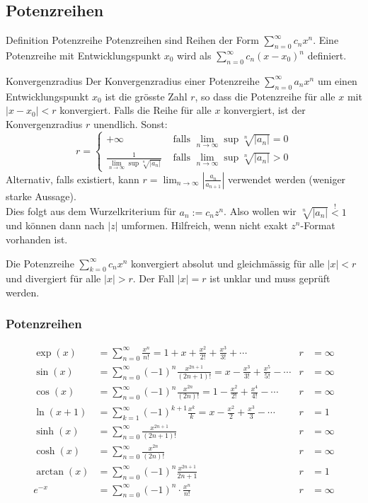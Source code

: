 \documentclass[a4paper,10pt]{article}
\def\limn{\lim_{n\to \infty}}
\def\sumk{\sum_{k=1}^\infty}
\def\sumn{\sum_{n=0}^\infty}
\begin{document}
\subsection{Potenzreihen}
\begin{subbox}{Definition Potenzreihe}
 Potenzreihen sind Reihen der Form $\sum_{n=0}^\infty c_n x^n$. Eine Potenzreihe mit Entwicklungspunkt $x_0$ wird als $\sum_{n=0}^\infty c_n(x-x_0)^n$ definiert.
\end{subbox}

\begin{mainbox}{Konvergenzradius}
 Der Konvergenzradius einer Potenzreihe $\sumn a_n x^n$ um einen Entwicklungspunkt $x_0$ ist die grösste Zahl $r$, so dass die Potenzreihe für alle $x$ mit $|x - x_0| < r$ konvergiert. Falls die Reihe für alle $x$ konvergiert, ist der Konvergenzradius $r$ unendlich. Sonst:
 $$r = \begin{cases}
    +\infty & \text{ falls } \limn\sup \sqrt[n]{|a_n|} = 0\\
    \frac{1}{\limn\sup \sqrt[n]{|a_n|}} & \text{ falls }  \limn\sup \sqrt[n]{|a_n|} > 0
 \end{cases} $$
 Alternativ, falls existiert, kann $r = \limn \left| \frac{a_n}{a_{n+1}} \right|$ verwendet werden (weniger starke Aussage).\\
 Dies folgt aus dem Wurzelkriterium für $a_n := c_n z^n$. Also wollen wir $\sqrt[n]{|a_n|} \overset{!}{<} 1$ und können dann nach $|z|$ umformen. Hilfreich, wenn nicht exakt $z^n$-Format vorhanden ist.
\end{mainbox}
Die Potenzreihe $\sum_{k=0}^\infty c_n x^n$ konvergiert absolut und gleichmässig für alle $|x| < r$ und divergiert für alle $|x| > r$. Der Fall $|x| = r$ ist unklar und muss geprüft werden.

\subsubsection{Potenzreihen}
\begin{align*}
\exp(x) &= \sumn \frac{x^n}{n!} = 1 + x + \frac{x^2}{2!} + \frac{x^3}{3!} + \cdots & r &= \infty \\
\sin(x) &= \sumn (-1)^n \frac{x^{2n + 1}}{(2n + 1)!} = x - \frac{x^3}{3!} + \frac{x^5}{5!} - \cdots & r &= \infty \\
\cos(x) &= \sumn (-1)^n \frac{x^{2n}}{(2n)!} = 1 - \frac{x^2}{2!} + \frac{x^4}{4!} - \cdots & r &= \infty \\
\ln(x + 1) &= \sumk (-1)^{k+1} \frac{x^k}{k} = x - \frac{x^2}{2} + \frac{x^3}{3} - \cdots & r &= 1 \\
\sinh(x) &= \sumn \frac{x^{2n+1}}{(2n+1)!} & r &= \infty \\
\cosh(x) &= \sumn \frac{x^{2n}}{(2n)!} & r &= \infty \\
\arctan(x) &= \sumn (-1)^n \frac{x^{2n+1}}{2n+1} & r &= 1 \\
e^{-x} &= \sumn (-1)^n \cdot \frac{x^n}{n!} & r &= \infty \\
\end{align*}
\end{document}
